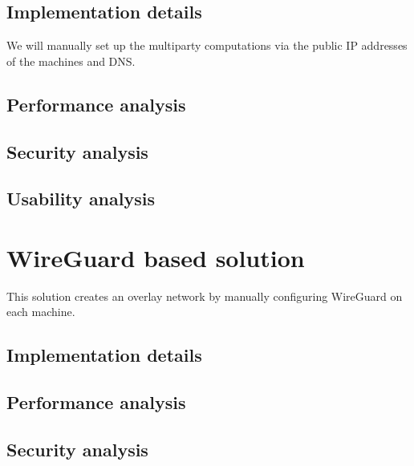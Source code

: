 \section{Implementation details}\label{thesis__050-internet-protocol.md__implementation-details}

We will manually set up the multiparty computations via the public IP addresses of the machines and DNS.

\section{Performance analysis}\label{thesis__050-internet-protocol.md__performance-analysis}

\section{Security analysis}\label{thesis__050-internet-protocol.md__security-analysis}

\section{Usability analysis}\label{thesis__050-internet-protocol.md__usability-analysis}

\label{thesis__060-wireguard.md}
\chapter{WireGuard based solution}\label{thesis__060-wireguard.md__wireguard-based-solution}

This solution creates an overlay network by manually configuring WireGuard on each machine.

\section{Implementation details}\label{thesis__060-wireguard.md__implementation-details}

\section{Performance analysis}\label{thesis__060-wireguard.md__performance-analysis}

\section{Security analysis}\label{thesis__060-wireguard.md__security-analysis}

